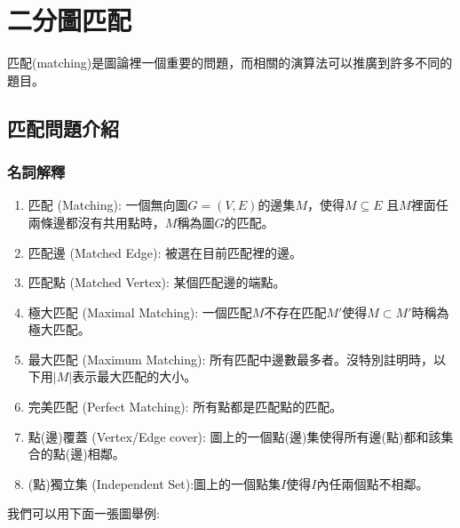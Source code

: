 \chapter{二分圖匹配}

\> 匹配(matching)是圖論裡一個重要的問題，而相關的演算法可以推廣到許多不同的題目。

\section{匹配問題介紹}

\subsection{名詞解釋}

\begin{enumerate}
	\item 匹配 (Matching): 一個無向圖$G = (V, E)$的邊集$M$，使得$M \subseteq E$ 且$M$裡面任兩條邊都沒有共用點時，$M$稱為圖$G$的匹配。
	\item 匹配邊 (Matched Edge): 被選在目前匹配裡的邊。
	\item 匹配點 (Matched Vertex): 某個匹配邊的端點。
	\item 極大匹配 (Maximal Matching): 一個匹配$M$不存在匹配$M'$使得$M \subset M'$時稱為極大匹配。
	\item 最大匹配 (Maximum Matching): 所有匹配中邊數最多者。沒特別註明時，以下用$|M|$表示最大匹配的大小。
	\item 完美匹配 (Perfect Matching): 所有點都是匹配點的匹配。
	\item 點(邊)覆蓋 (Vertex/Edge cover): 圖上的一個點(邊)集使得所有邊(點)都和該集合的點(邊)相鄰。 
	\item (點)獨立集 (Independent Set):圖上的一個點集\(I\)使得\(I\)內任兩個點不相鄰。
\end{enumerate}

\pagebreak
我們可以用下面一張圖舉例:

\begin{center}
\end{center}

